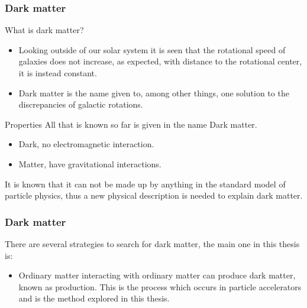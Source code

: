 \documentclass[handout]{beamer}
\begin{document}
\begin{frame}[shrink=10]\frametitle{Dark matter}
\begin{block}{What is dark matter?}
\begin{itemize}
\item Looking outside of our solar system it is seen that the rotational speed of galaxies does not increase, as expected, with distance to the rotational center, it is instead constant.
\item Dark matter is the name given to, among other things, one solution to the discrepancies of galactic rotations.
\end{itemize}
\end{block}
\begin{block}{Properties}
All that is known so far is given in the name Dark matter.
\begin{itemize}
\item Dark, no electromagnetic interaction.
\item Matter, have gravitational interactions.
\end{itemize}
It is known that it can not be made up by anything in the standard model of particle physics, thus a new physical description is needed to explain dark matter.
\end{block}
\end{frame}

\begin{frame}[shrink=10]\frametitle{Dark matter}
\begin{block}{}
There are several strategies to search for dark matter, the main one in this thesis is:
\begin{itemize}
\item Ordinary matter interacting with ordinary matter can produce dark matter, known as production. This is the process which occurs in particle accelerators and is the method explored in this thesis.
\end{itemize}
\end{block}
\end{frame}
\end{document}
